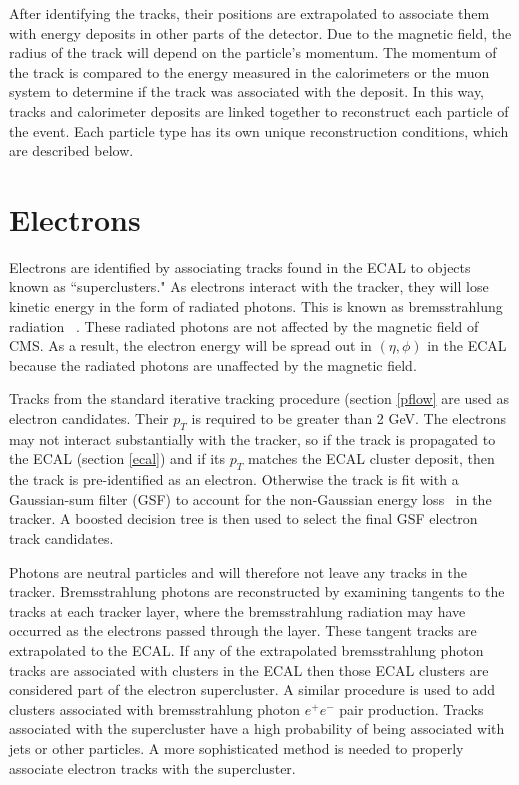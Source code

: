 \documentclass[oneside, letterpaper, oldfontcommands]{memoir}
\begin{document}
\qquad After identifying the tracks, their positions are extrapolated to associate them with energy deposits in other parts of the detector. Due to the magnetic field, the radius of the track will depend on the particle's momentum. The momentum of the track is compared to the energy measured in the calorimeters or the muon system to determine if the track was associated with the deposit. In this way, tracks and calorimeter deposits are linked together to reconstruct each particle of the event. Each particle type has its own unique reconstruction conditions, which are described below.

\section{Electrons}\label{electrons}

\qquad Electrons are identified by associating tracks found in the ECAL to objects known as ``superclusters." As electrons interact with the tracker, they will lose kinetic energy in the form of radiated photons. This is known as bremsstrahlung radiation ~\cite{griffiths1999introduction}. These radiated photons are not affected by the magnetic field of CMS. As a result, the electron energy will be spread out in $(\eta,\phi)$ in the ECAL because the radiated photons are unaffected by the magnetic field. 

\qquad Tracks from the standard iterative tracking procedure (section \ref{pflow} are used as electron candidates. Their $p_{T}$ is required to be greater than 2 GeV. The electrons may not interact substantially with the tracker, so if the track is propagated to the ECAL (section \ref{ecal}) and if its $p_{T}$ matches the ECAL cluster deposit, then the track is pre-identified as an electron. Otherwise the track is fit with a Gaussian-sum filter (GSF) to account for the non-Gaussian energy loss~\cite{Adam:815410} in the tracker. A boosted decision tree\cite{Hocker:2007ht} is then used to select the final GSF electron track candidates.  

\qquad Photons are neutral particles and will therefore not leave any tracks in the tracker. Bremsstrahlung photons are reconstructed by examining tangents to the tracks at each tracker layer, where the bremsstrahlung radiation may have occurred as the electrons passed through the layer. These tangent tracks are extrapolated to the ECAL. If any of the extrapolated bremsstrahlung photon tracks are associated with clusters in the ECAL then those ECAL clusters are considered part of the electron supercluster. A similar procedure is used to add clusters associated with bremsstrahlung photon $e^{+}e^{-}$ pair production. Tracks associated with the supercluster have a high probability of being associated with jets or other particles. A more sophisticated method is needed to properly associate electron tracks with the supercluster.
\end{document}
